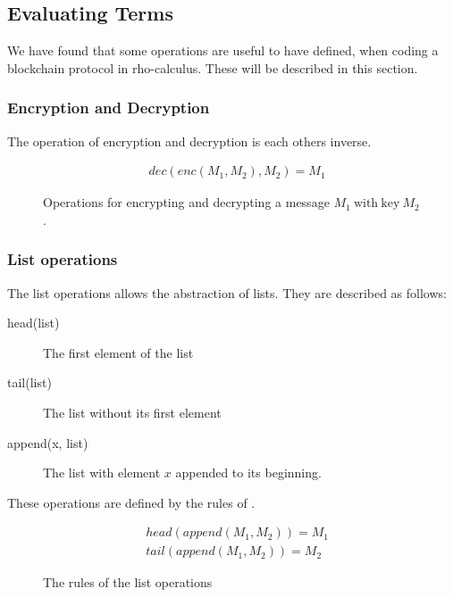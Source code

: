 \subsection{Evaluating Terms}
We have found that some operations are useful to have defined, when coding a blockchain protocol in rho-calculus. These will be described in this section.



\subsubsection{Encryption and Decryption}
The operation of encryption and decryption is each others inverse.
\begin{figure}[h]
    \begin{align*}
        &dec(enc(M_1, M_2),M_2) = M_1 \tag{Decrypt}
    \end{align*}
    \caption{Operations for encrypting and decrypting a message $M_1\ \mathrm{with\ key}\ M_2$.}
\end{figure}
\FloatBarrier

\subsubsection{List operations}

The list operations allows the abstraction of lists. They are described as follows:

\begin{description}
	\item[head(list)] The first element of the list
	\item[tail(list)] The list without its first element
	\item[append(x, list)] The list with element $x$ appended to its beginning.
\end{description}

These operations are defined by the rules of .

\begin{figure}[h]
	\begin{align*}
		&head(append(M_1, M_2)) = M_1 \tag{Head} \\
		&tail(append(M_1, M_2)) = M_2 \tag{Tail}
	\end{align*}
	\caption{The rules of the list operations}
	\label{listoprules}
\end{figure}

\FloatBarrier


